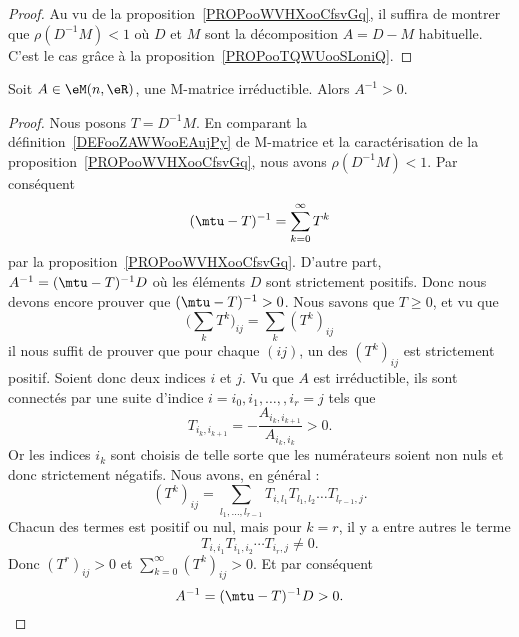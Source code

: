 \begin{proof}
	Au vu de la proposition~\ref{PROPooWVHXooCfsvGq}, il suffira de montrer que \( \rho(D^{-1}M)<1\) où \( D\) et \( M\) sont la décomposition \( A=D-M\) habituelle. C'est le cas grâce à la proposition~\ref{PROPooTQWUooSLoniQ}.
\end{proof}

\begin{proposition}     \label{PROPooZDMQooIZAbKK}
	Soit \( A\in \eM(n,\eR)\), une M-matrice irréductible. Alors \( A^{-1}>0\).
\end{proposition}

\begin{proof}
	Nous posons \( T=D^{-1}M\). En comparant la définition~\ref{DEFooZAWWooEAujPy} de M-matrice et la caractérisation de la proposition~\ref{PROPooWVHXooCfsvGq}, nous avons \( \rho(D^{-1}M)<1\). Par conséquent
	\begin{equation}
		(\mtu-T)^{-1}=\sum_{k=0}^{\infty}T^k
	\end{equation}
	par la proposition~\ref{PROPooWVHXooCfsvGq}. D'autre part, \( A^{-1}=(\mtu-T)^{-1}D\) où les éléments \( D\) sont strictement positifs. Donc nous devons encore prouver que \( (\mtu-T)^{-1}>0\). Nous savons que \( T\geq 0\), et vu que
	\begin{equation}
		\big(\sum_kT^k)_{ij}=\sum_k(T^k)_{ij}
	\end{equation}
	il nous suffit de prouver que pour chaque \( (ij)\), un des \( (T^k)_{ij}\) est strictement positif. Soient donc deux indices \( i\) et \( j\). Vu que \( A\) est irréductible, ils sont connectés par une suite d'indice \( i=i_0,i_1,\ldots, ,i_r=j\) tels que
	\begin{equation}
		T_{i_k,i_{k+1}}=-\frac{ A_{i_k,i_{k+1}} }{ A_{i_k,i_k} }>0.
	\end{equation}
	Or les indices \( i_k\) sont choisis de telle sorte que les numérateurs soient non nuls et donc strictement négatifs. Nous avons, en général :
	\begin{equation}
		(T^k)_{ij}=\sum_{l_1,\ldots, l_{r-1}}T_{i,l_1}T_{l_1,l_2}\ldots T_{l_{r-1},j}.
	\end{equation}
	Chacun des termes est positif ou nul, mais pour \( k=r\), il y a entre autres le terme
	\begin{equation}
		T_{i,i_1}T_{i_1,i_2}\cdots T_{i_r,j}\neq 0.
	\end{equation}
	Donc \( (T^r)_{ij}>0\) et \( \sum_{k=0}^{\infty}(T^k)_{ij}>0\). Et par conséquent
	\begin{equation}
		A^{-1}=(\mtu-T)^{-1}D>0.
	\end{equation}
\end{proof}


